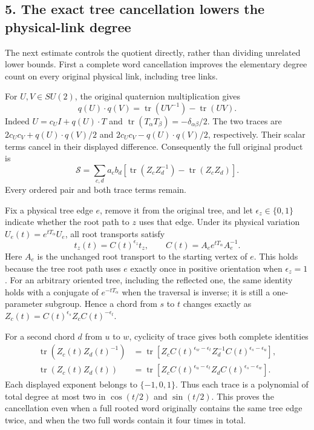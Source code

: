 \documentclass[11pt]{article}
\begin{document}
\subsection*{5. The exact tree cancellation lowers the physical-link degree}

The next estimate controls the quotient directly, rather than dividing unrelated lower bounds. First a complete word cancellation improves the elementary degree count on every original physical link, including tree links.

For \(U,V\in SU(2)\), the original quaternion multiplication gives
\[
 q(U)\cdot q(V)=\operatorname{tr}(UV^{-1})-\operatorname{tr}(UV).
 \tag{PRE32}
\]
Indeed \(U=c_UI+q(U)\cdot T\) and
\(\operatorname{tr}(T_\alpha T_\beta)=-\delta_{\alpha\beta}/2\).
The two traces are \(2c_Uc_V+q(U)\cdot q(V)/2\) and
\(2c_Uc_V-q(U)\cdot q(V)/2\), respectively. Their scalar terms cancel in their displayed difference. Consequently the full original product is
\[
 \mathcal S=\sum_{c,d}a_cb_d
        [\operatorname{tr}(Z_cZ_d^{-1})
                    -\operatorname{tr}(Z_cZ_d)].
 \tag{PRE33}
\]
Every ordered pair and both trace terms remain.

Fix a physical tree edge \(e\), remove it from the original tree, and let \(\epsilon_z\in\{0,1\}\) indicate whether the root path to \(z\) uses that edge. Under its physical variation \(U_e(t)=e^{tT_\alpha}U_e\), all root transports satisfy
\[
 t_z(t)=C(t)^{\epsilon_z}t_z,\qquad
 C(t)=A_e e^{tT_\alpha}A_e^{-1}.
 \tag{PRE34}
\]
Here \(A_e\) is the unchanged root transport to the starting vertex of \(e\). This holds because the tree root path uses \(e\) exactly once in positive orientation when \(\epsilon_z=1\). For an arbitrary oriented tree, including the reflected one, the same identity holds with a conjugate of \(e^{-tT_\alpha}\) when the traversal is inverse; it is still a one-parameter subgroup. Hence a chord from \(s\) to \(t\) changes exactly as \(Z_c(t)=C(t)^{\epsilon_s}Z_cC(t)^{-\epsilon_t}\).

For a second chord \(d\) from \(u\) to \(w\), cyclicity of trace gives both complete identities
\[
 \begin{aligned}
 \operatorname{tr}(Z_c(t)Z_d(t)^{-1})
   &=\operatorname{tr}\!\left[
       Z_cC(t)^{\epsilon_w-\epsilon_t}
       Z_d^{-1}C(t)^{\epsilon_s-\epsilon_u}\right],\\
 \operatorname{tr}(Z_c(t)Z_d(t))
   &=\operatorname{tr}\!\left[
       Z_cC(t)^{\epsilon_u-\epsilon_t}
       Z_dC(t)^{\epsilon_s-\epsilon_w}\right].
 \end{aligned}\tag{PRE35}
\]
Each displayed exponent belongs to \(\{-1,0,1\}\). Thus each trace is a polynomial of total degree at most two in \(\cos(t/2)\) and \(\sin(t/2)\). This proves the cancellation even when a full rooted word originally contains the same tree edge twice, and when the two full words contain it four times in total.
\end{document}
